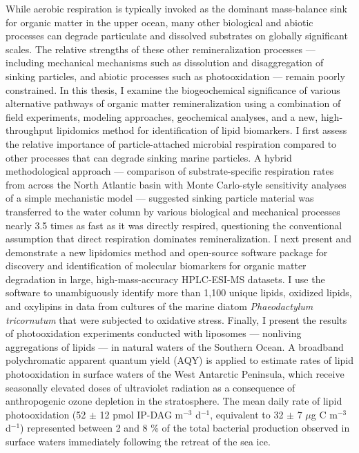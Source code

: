 % 
% 
%
While aerobic respiration is typically invoked as the dominant mass-balance sink for organic matter in the upper ocean, many other biological and abiotic processes can degrade particulate and dissolved substrates on globally significant scales. The relative strengths of these other remineralization processes --- including mechanical mechanisms such as dissolution and disaggregation of sinking particles, and abiotic processes such as photooxidation --- remain poorly constrained. In this thesis, I examine the biogeochemical significance of various alternative pathways of organic matter remineralization using a combination of field experiments, modeling approaches, geochemical analyses, and a new, high-throughput lipidomics method for identification of lipid biomarkers. I first assess the relative importance of particle-attached microbial respiration compared to other processes that can degrade sinking marine particles. A hybrid methodological approach --- comparison of substrate-specific respiration rates from across the North Atlantic basin with Monte Carlo-style sensitivity analyses of a simple mechanistic model --- suggested sinking particle material was transferred to the water column by various biological and mechanical processes nearly 3.5 times as fast as it was directly respired, questioning the conventional assumption that direct respiration dominates remineralization. I next present and demonstrate a new lipidomics method and open-source software package for discovery and identification of molecular biomarkers for organic matter degradation in large, high-mass-accuracy HPLC-ESI-MS datasets. I use the software to unambiguously identify more than 1,100 unique lipids, oxidized lipids, and oxylipins in data from cultures of the marine diatom \emph{Phaeodactylum tricornutum} that were subjected to oxidative stress. Finally, I present the results of photooxidation experiments conducted with liposomes --- nonliving aggregations of lipids --- in natural waters of the Southern Ocean. A broadband polychromatic apparent quantum yield (AQY) is applied to estimate rates of lipid photooxidation in surface waters of the West Antarctic Peninsula, which receive seasonally elevated doses of ultraviolet radiation as a consequence of anthropogenic ozone depletion in the stratosphere. The mean daily rate of lipid photooxidation (52 $\pm$ 12 pmol IP-DAG m$^{-3}$ d$^{-1}$, equivalent to 32 $\pm$ 7 $\mu$g C m$^{-3}$ d$^{-1}$) represented between 2 and 8 \% of the total bacterial production observed in surface waters immediately following the retreat of the sea ice.
